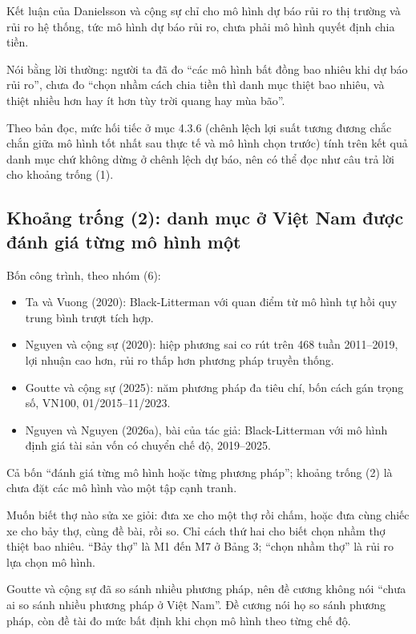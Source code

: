 Kết luận của Danielsson và cộng sự chỉ cho mô hình dự báo rủi ro thị trường và rủi ro hệ thống, tức mô hình dự báo rủi ro, chưa phải mô hình quyết định chia tiền.

Nói bằng lời thường: người ta đã đo “các mô hình bất đồng bao nhiêu khi dự báo rủi ro”, chưa đo “chọn nhầm cách chia tiền thì danh mục thiệt bao nhiêu, và thiệt nhiều hơn hay ít hơn tùy trời quang hay mùa bão”.

Theo bản đọc, mức hối tiếc ở mục 4.3.6 (chênh lệch lợi suất tương đương chắc chắn giữa mô hình tốt nhất sau thực tế và mô hình chọn trước) tính trên kết quả danh mục chứ không dừng ở chênh lệch dự báo, nên có thể đọc như câu trả lời cho khoảng trống (1).

\subsection{Khoảng trống (2): danh mục ở Việt Nam được đánh giá từng mô hình một}

Bốn công trình, theo nhóm (6):

\begin{itemize}
\item
  Ta và Vuong (2020): Black-Litterman với quan điểm từ mô hình tự hồi quy trung bình trượt tích hợp.
\item
  Nguyen và cộng sự (2020): hiệp phương sai co rút trên 468 tuần 2011--2019, lợi nhuận cao hơn, rủi ro thấp hơn phương pháp truyền thống.
\item
  Goutte và cộng sự (2025): năm phương pháp đa tiêu chí, bốn cách gán trọng số, VN100, 01/2015--11/2023.
\item
  Nguyen và Nguyen (2026a), bài của tác giả: Black-Litterman với mô hình định giá tài sản vốn có chuyển chế độ, 2019--2025.
\end{itemize}

Cả bốn “đánh giá từng mô hình hoặc từng phương pháp”; khoảng trống (2) là chưa đặt các mô hình vào một tập cạnh tranh.

Muốn biết thợ nào sửa xe giỏi: đưa xe cho một thợ rồi chấm, hoặc đưa cùng chiếc xe cho bảy thợ, cùng đề bài, rồi so. Chỉ cách thứ hai cho biết chọn nhầm thợ thiệt bao nhiêu. “Bảy thợ” là M1 đến M7 ở Bảng 3; “chọn nhầm thợ” là rủi ro lựa chọn mô hình.

Goutte và cộng sự đã so sánh nhiều phương pháp, nên đề cương không nói “chưa ai so sánh nhiều phương pháp ở Việt Nam”. Đề cương nói họ so sánh phương pháp, còn đề tài đo mức bất định khi chọn mô hình theo từng chế độ.

